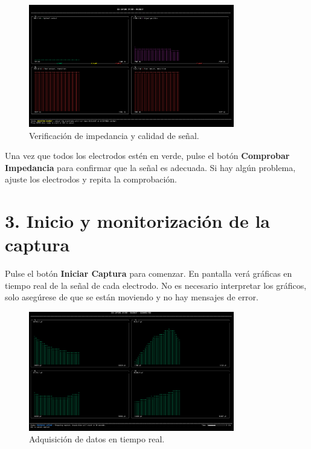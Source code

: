 \begin{figure}[h!]
    \centering
    \includegraphics[width=0.8\textwidth]{assets/screenshots/capturer/impedance_check.png}
    \caption{Verificación de impedancia y calidad de señal.}
\end{figure}

Una vez que todos los electrodos estén en verde, pulse el botón \textbf{Comprobar Impedancia} para confirmar que la señal es adecuada. Si hay algún problema, ajuste los electrodos y repita la comprobación.

\newpage
\section*{3. Inicio y monitorización de la captura}
Pulse el botón \textbf{Iniciar Captura} para comenzar. En pantalla verá gráficas en tiempo real de la señal de cada electrodo. No es necesario interpretar los gráficos, solo asegúrese de que se están moviendo y no hay mensajes de error.

\begin{figure}[h!]
    \centering
    \includegraphics[width=0.8\textwidth]{assets/screenshots/capturer/data_acquisition.png}
    \caption{Adquisición de datos en tiempo real.}
\end{figure}


